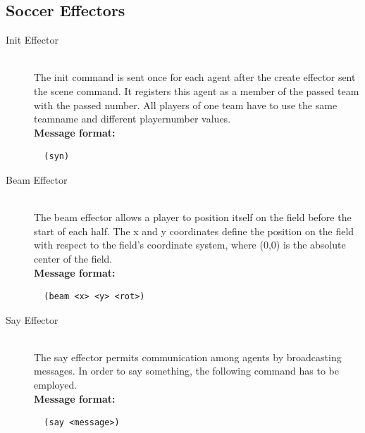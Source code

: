 \subsection{Soccer Effectors}
\begin{description}
  \item [Init Effector] \hfill \\
  The init command is sent once for each agent after the create effector sent the scene command. It registers this agent as a member of the passed team with the passed number. All players of one team have to use the same teamname and different playernumber values.
  \hfill \\
{ \bf Message format:}
  \begin{verbatim}
  (syn)
  \end{verbatim}
  \item [Beam Effector] \hfill \\
  The beam effector allows a player to position itself on the field before the start of each half. The x and y coordinates define the position on the field with respect to the field's coordinate system, where (0,0) is the absolute center of the field.
  \hfill \\
{ \bf Message format:}
  \begin{verbatim}
  (beam <x> <y> <rot>)
  \end{verbatim}
  \item [Say Effector] \hfill \\
  The say effector permits communication among agents by broadcasting messages. In order to say something, the following command has to be employed.
  \hfill \\
{ \bf Message format:}
  \begin{verbatim}
  (say <message>)
  \end{verbatim}
\end{description}
